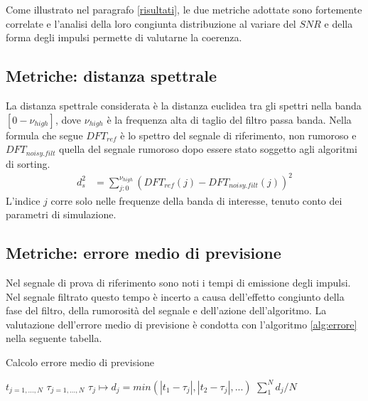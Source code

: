 \documentclass[9pt,twocolumn,twoside]{osajnl}
\begin{document}
Come illustrato nel paragrafo \ref{risultati}, le due metriche adottate sono fortemente correlate e l'analisi della loro congiunta distribuzione al variare del $SNR$ e della forma degli impulsi permette di valutarne la coerenza.



\subsection{Metriche: distanza spettrale}
\label{metricaS}

La distanza spettrale considerata è la distanza euclidea tra gli spettri nella banda $[0-\nu_{high}]$, dove $\nu_{high}$ è la frequenza alta di taglio del filtro passa banda.
% 
Nella formula che segue $DFT_{ref}$ è lo spettro del segnale di riferimento, non rumoroso e $DFT_{noisy.filt}$ quella del segnale rumoroso dopo essere stato soggetto agli algoritmi di sorting.
%
\begin{align*}
 d_{s}^2 & = \sum_{j:0}^{\nu_{high}}(DFT_{ref}(j) - DFT_{noisy.filt}(j) )^2
\end{align*}
%
L'indice $j$ corre solo nelle frequenze della banda di interesse, tenuto conto dei parametri di simulazione.




\subsection{Metriche: errore medio di previsione}
\label{metricaT}

Nel segnale di prova di riferimento sono noti i tempi di emissione degli impulsi.
%
Nel segnale filtrato questo tempo è incerto a causa dell'effetto congiunto della fase del filtro, della rumorosità del segnale e dell'azione dell'algoritmo.
%
La valutazione dell'errore medio di previsione è condotta con l'algoritmo \ref{alg:errore} nella seguente tabella.
%
\begin{algorithm}
\caption{Calcolo errore medio di previsione}\label{alg:errore}
\begin{algorithmic}[1]
\State $t_{j=1,...,N}$ 
\State $\tau_{j=1,...,N}$ 
\State $\tau_{j}\mapsto d_{j} = min( |t_{1}-\tau_{j}|, |t_{2}-\tau_{j}|, ...)$ 
\State $\sum_{1}^{N} d_{j}/N$ 
\end{algorithmic}
\end{algorithm}
\end{document}
